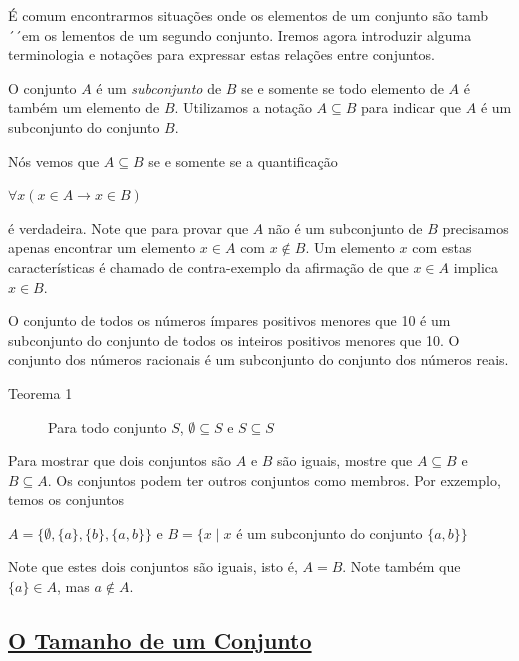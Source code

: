 É comum encontrarmos situações onde os elementos de um conjunto são tamb´´em os
lementos de um segundo conjunto. Iremos agora introduzir alguma terminologia e
notações para expressar estas relações entre conjuntos.

\begin{defn}
\label{def33}
O conjunto $A$ é um \emph{subconjunto} de $B$ se e somente se todo elemento de
$A$ é também um elemento de $B$. Utilizamos a notação $A \subseteq B$
para indicar que $A$ é um subconjunto do conjunto $B$.
\end{defn}

Nós vemos que $A \subseteq B$ se e somente se a quantificação
\begin{center}$\forall x (x \in A \to x \in B)$\end{center}
\noindent é verdadeira. Note que para provar que $A$ não é um subconjunto de $B$
precisamos apenas encontrar um elemento $x \in A$ com $x \notin B$. Um elemento
$x$ com estas características é chamado de contra-exemplo da afirmação de que
$x \in A$ implica $x \in B$.

\begin{exmp}
\label{exem37}
O conjunto de todos os números ímpares positivos menores que 10 é um subconjunto
do conjunto de todos os inteiros positivos menores que 10. O conjunto dos
números racionais é um subconjunto do conjunto dos números reais.
\end{exmp}

\begin{description}
\item[Teorema 1] Para todo conjunto $S$, $\emptyset \subseteq S$ e $S \subseteq
S$
\end{description}

Para mostrar que dois conjuntos são $A$ e $B$ são iguais, mostre que $A
\subseteq B$ e $B \subseteq A$. Os conjuntos podem ter outros conjuntos como
membros. Por exzemplo, temos os conjuntos
\begin{center}
$A = \{\emptyset, \{a\}, \{b\}, \{a,b\}\}$ e $B = \{x \mid x$ é um subconjunto
do conjunto $\{a,b\}\}$
\end{center}

Note que estes dois conjuntos são iguais, isto é, $A = B$. Note também que
$\{a\} \in A$, mas $a \notin A$.

\subsection*{\underline{O Tamanho de um Conjunto}}

